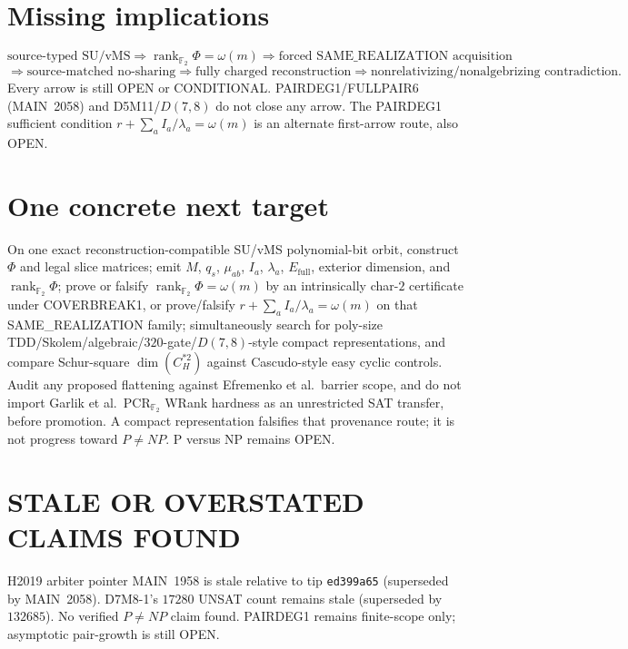 \documentclass[11pt]{article}
\begin{document}
\section*{Missing implications}
\[
\text{source-typed SU/vMS}
\Longrightarrow
\operatorname{rank}_{\mathbb F_2}\Phi=\omega(m)
\Longrightarrow
\text{forced SAME\_REALIZATION acquisition}
\]
\[
\Longrightarrow
\text{source-matched no-sharing}
\Longrightarrow
\text{fully charged reconstruction}
\Longrightarrow
\text{nonrelativizing/nonalgebrizing contradiction}.
\]
Every arrow is still OPEN or CONDITIONAL. PAIRDEG1/FULLPAIR6 (MAIN~2058) and
D5M11/$D(7,8)$ do not close any arrow. The PAIRDEG1 sufficient condition
$r+\sum_a I_a/\lambda_a=\omega(m)$ is an alternate first-arrow route, also OPEN.

\section*{One concrete next target}
On one exact reconstruction-compatible SU/vMS polynomial-bit orbit, construct
$\Phi$ and legal slice matrices; emit $M$, $q_s$, $\mu_{ab}$, $I_a$, $\lambda_a$,
$E_{\mathrm{full}}$, exterior dimension, and $\operatorname{rank}_{\mathbb F_2}\Phi$;
prove or falsify $\operatorname{rank}_{\mathbb F_2}\Phi=\omega(m)$ by an
intrinsically char-$2$ certificate under COVERBREAK1, or prove/falsify
$r+\sum_a I_a/\lambda_a=\omega(m)$ on that SAME\_REALIZATION family; simultaneously
search for poly-size TDD/Skolem/algebraic/$320$-gate/$D(7,8)$-style compact
representations, and compare Schur-square $\dim(C_H^{*2})$ against Cascudo-style
easy cyclic controls. Audit any proposed flattening against Efremenko et al.\
barrier scope, and do not import Garlik et al.\ PCR$_{\mathbb F_2}$ WRank hardness
as an unrestricted SAT transfer, before promotion. A compact representation
falsifies that provenance route; it is not progress toward $P\neq NP$.
P versus NP remains OPEN.

\section*{STALE OR OVERSTATED CLAIMS FOUND}
H2019 arbiter pointer MAIN~1958 is stale relative to tip \texttt{ed399a65}
(superseded by MAIN~2058). D7M8-1's $17280$ UNSAT count remains stale
(superseded by $132685$). No verified $P\neq NP$ claim found. PAIRDEG1 remains
finite-scope only; asymptotic pair-growth is still OPEN.
\end{document}

